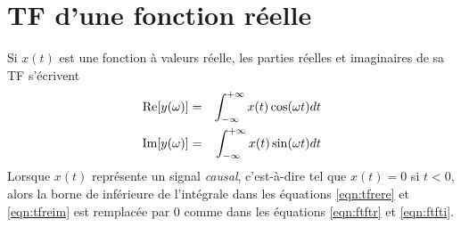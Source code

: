\section{TF d'une fonction réelle}
Si $x(t)$ est une fonction à valeurs réelle, les parties réelles
et imaginaires de sa TF s'écrivent
\begin{eqnarray}
\label{eqn:tfrere}
\mbox{Re}[y(\omega)] & = & \int_{-\infty}^{+\infty} x(t) \cos(\omega t) dt \\
\label{eqn:tfreim}
\mbox{Im}[y(\omega)] & = & \int_{-\infty}^{+\infty} x(t) \sin(\omega t) dt 
\end{eqnarray}
Lorsque $x(t)$ représente un signal \emph{causal}, c'est-à-dire tel
que $x(t)=0$ si $t<0$, alors la borne de inférieure de l'intégrale
dans les équations \ref{eqn:tfrere} et \ref{eqn:tfreim} est remplacée par $0$
comme dans les équations \ref{eqn:ftftr} et \ref{eqn:ftfti}.
